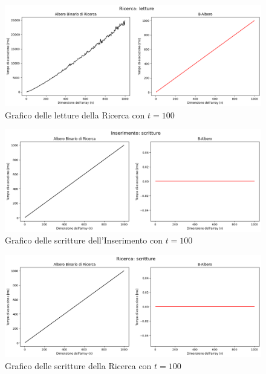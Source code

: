 \begin{figure}[H]
    \centering
    \includegraphics[width=\textwidth]{side-graphs/search-r-t100.png}
    \caption{Grafico delle letture della Ricerca con $t=100$}
    \label{fig:sidegraphsearchread100}
\end{figure}

\begin{figure}[H]
    \centering
    \includegraphics[width=\textwidth]{side-graphs/insert-w-t100.png}
    \caption{Grafico delle scritture dell'Inserimento con $t=100$}
    \label{fig:sidegraphinsertwrite100}
\end{figure}
    
\begin{figure}[H]
    \centering
    \includegraphics[width=\textwidth]{side-graphs/search-w-t100.png}
    \caption{Grafico delle scritture della Ricerca con $t=100$}
    \label{fig:sidegraphsearchwrite100}
\end{figure}

